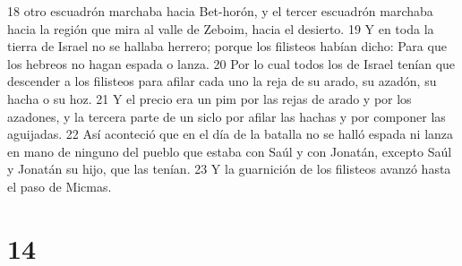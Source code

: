 18 otro escuadrón marchaba hacia Bet-horón, y el tercer escuadrón marchaba hacia la región que mira al valle de Zeboim, hacia el desierto.
19 Y en toda la tierra de Israel no se hallaba herrero; porque los filisteos habían dicho: Para que los hebreos no hagan espada o lanza.
20 Por lo cual todos los de Israel tenían que descender a los filisteos para afilar cada uno la reja de su arado, su azadón, su hacha o su hoz.
21 Y el precio era un pim por las rejas de arado y por los azadones, y la tercera parte de un siclo   por afilar las hachas y por componer las aguijadas.
22 Así aconteció que en el día de la batalla no se halló espada ni lanza en mano de ninguno del pueblo que estaba con Saúl y con Jonatán, excepto Saúl y Jonatán su hijo, que las tenían.
23 Y la guarnición de los filisteos avanzó hasta el paso de Micmas.

\chapter{14}


